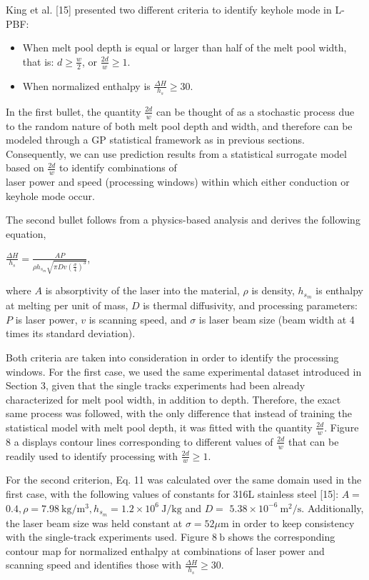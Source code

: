 \documentclass[10pt]{article}
\begin{document}
King et al. [15] presented two different criteria to identify keyhole mode in L-PBF:

\begin{itemize}
  \item When melt pool depth is equal or larger than half of the melt pool width, that is: $d \geq \frac{w}{2}$, or $\frac{2 d}{w} \geq 1$.

  \item When normalized enthalpy is $\frac{\Delta H}{h_{s}} \geq 30$.

\end{itemize}

In the first bullet, the quantity $\frac{2 d}{w}$ can be thought of as a stochastic process due to the random nature of both melt pool depth and width, and therefore can be modeled through a GP statistical framework as in previous sections. Consequently, we can use prediction results from a statistical surrogate model based on $\frac{2 d}{w}$ to identify combinations of\\
laser power and speed (processing windows) within which either conduction or keyhole mode occur.

The second bullet follows from a physics-based analysis and derives the following equation,

$\frac{\Delta H}{h_{s}}=\frac{A P}{\rho h_{s_{m}} \sqrt{\pi D v\left(\frac{\sigma}{4}\right)^{3}}}$,

where $A$ is absorptivity of the laser into the material, $\rho$ is density, $h_{s_{m}}$ is enthalpy at melting per unit of mass, $D$ is thermal diffusivity, and processing parameters: $P$ is laser power, $v$ is scanning speed, and $\sigma$ is laser beam size (beam width at 4 times its standard deviation).

Both criteria are taken into consideration in order to identify the processing windows. For the first case, we used the same experimental dataset introduced in Section 3, given that the single tracks experiments had been already characterized for melt pool width, in addition to depth. Therefore, the exact same process was followed, with the only difference that instead of training the statistical model with melt pool depth, it was fitted with the quantity $\frac{2 d}{w}$. Figure 8 a displays contour lines corresponding to different values of $\frac{2 d}{w}$ that can be readily used to identify processing with $\frac{2 d}{w} \geq 1$.

For the second criterion, Eq. 11 was calculated over the same domain used in the first case, with the following values of constants for 316L stainless steel [15]: $A=$ $0.4, \rho=7.98 \mathrm{~kg} / \mathrm{m}^{3}, h_{s_{m}}=1.2 \times 10^{6} \mathrm{~J} / \mathrm{kg}$ and $D=$ $5.38 \times 10^{-6} \mathrm{~m}^{2} / \mathrm{s}$. Additionally, the laser beam size was held constant at $\sigma=52 \mu \mathrm{m}$ in order to keep consistency with the single-track experiments used. Figure $8 \mathrm{~b}$ shows the corresponding contour map for normalized enthalpy at combinations of laser power and scanning speed and identifies those with $\frac{\Delta H}{h_{s}} \geq 30$.
\end{document}
